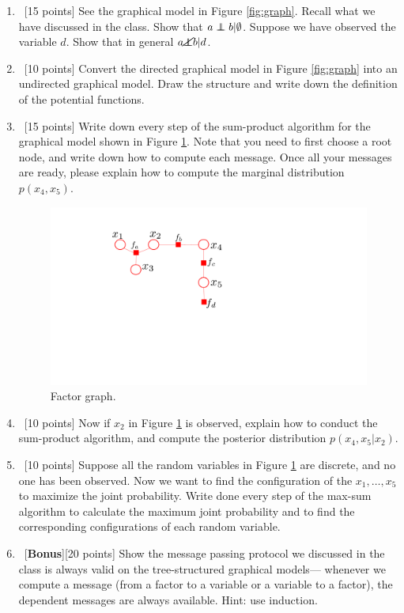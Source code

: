 \documentclass[12pt, fullpage,letterpaper]{article}
\newcommand\independent{\protect\mathpalette{\protect\independenT}{\perp}}
\def\independenT#1#2{\mathrel{\rlap{$#1#2$}\mkern2mu{#1#2}}}
\begin{document}
\begin{enumerate}
\item~[15 points] See the graphical model in Figure \ref{fig:graph}. Recall what we have discussed in the class. Show that $a \independent b | \emptyset $. Suppose we have observed the variable $d$. Show that in general $a \cancel{ \independent} b | d$.

\item~[10  points] Convert the directed graphical model in Figure \ref{fig:graph} into an undirected graphical model. Draw the structure and write down the definition of the potential functions. 

\item~[15 points] Write down every step of the sum-product algorithm for the graphical model shown in Figure \ref{fig:graph2}. Note that you need to first choose a root node, and write down how to compute each message. Once all your messages are ready, please explain how to compute the marginal distribution $p(x_4, x_5)$.

\begin{figure}[h]
	\centering
	\includegraphics[width=0.4\linewidth]{./fig2.pdf} 
	\caption{Factor graph.} \label{fig:graph2}
\end{figure}


\item~[10 points] Now if $x_2$ in Figure \ref{fig:graph2} is observed, explain how to conduct the sum-product algorithm, and compute the posterior distribution $p(x_4, x_5|x_2)$.

\item~[10 points] Suppose all the random variables in Figure \ref{fig:graph2} are discrete, and no one has been observed. Now we want to find the configuration of the $x_1, \ldots, x_5$ to maximize the joint probability. Write done every step of the max-sum algorithm to calculate the maximum joint probability and to find the corresponding configurations of each random variable. 


\item~[\textbf{Bonus}][20 points] Show the message passing protocol we discussed in the class is always valid on the tree-structured graphical models--- whenever we compute a message (from a factor to a variable or a variable to a factor), the dependent messages are always available. Hint: use induction. 


\end{enumerate}
\end{document}

